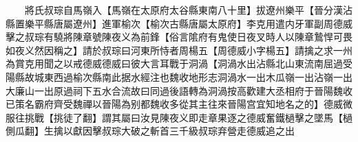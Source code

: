 　　將氏叔琮自馬嶺入【馬嶺在太原府太谷縣東南八十里】拔遼州樂平【晉分漢沾縣置樂平縣唐屬遼州】進軍榆次【榆次古縣唐屬太原府】李克用遣内牙軍副周德威擊之叔琮有驍將陳章號陳夜义為前鋒【俗言隂府有鬼使日夜叉時人以陳章鷙悍可畏如夜义然因稱之】請於叔琮曰河東所恃者周楊五【周德威小字楊五】請擒之求一州為賞克用聞之以戒德威德威曰彼大言耳戰于洞渦【洞渦水出沾縣北山東流南屈過受陽縣故城東西過榆次縣南此据水經注也魏收地形志洞渦水一出木瓜嶺一出沾嶺一出大廉山一出原過祠下五水合流故曰同過後語轉為洞渦按高歡建大丞相府于晉陽魏收已策名霸府齊受魏禪以晉陽為别都魏收多從其主往來晉陽宫宜知地名之的】德威微服往挑戰【挑徒了翻】謂其屬曰汝見陳夜义即走章果逐之德威奮鐵檛擊之墜馬【檛側瓜翻】生擒以獻因擊叔琮大破之斬首三千級叔琮弃營走德威追之出